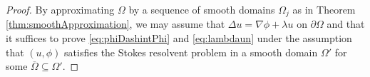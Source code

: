 \begin{proof}
  By approximating $\Omega$ by a sequence of smooth domains $\Omega_j$ as in Theorem \ref{thm:smoothApproximation}, we may assume that $\Delta u = \nabla \phi + \lambda u$ on $\partial\Omega$ and that it suffices to prove \eqref{eq:phiDashintPhi} and \eqref{eq:lambdaun} under the assumption that $(u,\phi)$ satisfies the Stokes resolvent problem in a smooth domain $\Omega'$ for some $\overline \Omega \subseteq \Omega'$.

\end{proof}
